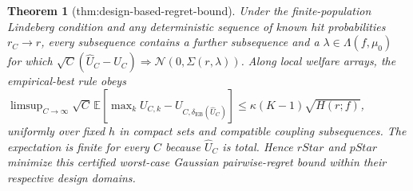 \documentclass{article}
\newtheorem{theorem}{Theorem}
\begin{document}
\begin{theorem}[thm:design-based-regret-bound]\label{thm:design-based-regret-bound}
Under the finite-population Lindeberg condition and any deterministic sequence of known hit probabilities \(r_C\to r\), every subsequence contains a further subsequence and a \(\lambda\in\Lambda(f,\mu_0)\) for which \(\sqrt C(\widehat U_C-U_C)\Rightarrow\mathcal N(0,\Sigma(r,\lambda))\). Along local welfare arrays, the empirical-best rule obeys \(\limsup_{C\to\infty}\sqrt C\,\mathbb E[\max_k U_{C,k}-U_{C,\delta_{\mathrm{EB}}(\widehat U_C)}]\le\kappa(K-1)\sqrt{H(r;f)}\), uniformly over fixed \(h\) in compact sets and compatible coupling subsequences. The expectation is finite for every \(C\) because \(\widehat U_C\) is total. Hence \(rStar\) and \(pStar\) minimize this certified worst-case Gaussian pairwise-regret bound within their respective design domains.
\end{theorem}
\end{document}
